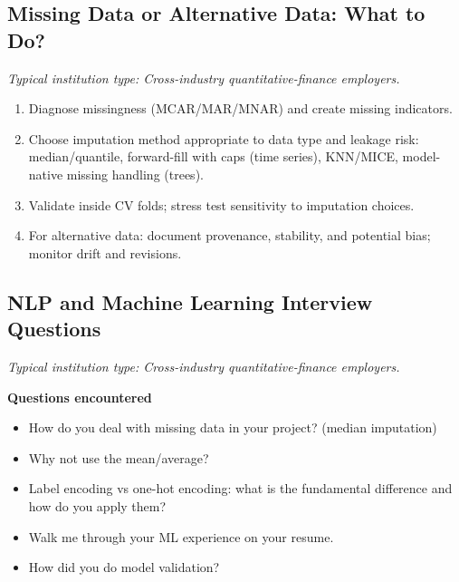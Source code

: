 \documentclass[11pt,letterpaper,openany]{book}
\newcommand{\RoleProfile}[2]{%
  \subsection{#1}%
  \noindent\textit{Typical institution type: #2.}\par
}
\begin{document}
\RoleProfile{Missing Data or Alternative Data: What to Do?}{Cross-industry quantitative-finance employers}
\begin{enumerate}
  \item Diagnose missingness (MCAR/MAR/MNAR) and create missing indicators.
  \item Choose imputation method appropriate to data type and leakage risk: median/quantile, forward-fill with caps (time series), KNN/MICE, model-native missing handling (trees).
  \item Validate inside CV folds; stress test sensitivity to imputation choices.
  \item For alternative data: document provenance, stability, and potential bias; monitor drift and revisions.
\end{enumerate}

\RoleProfile{NLP and Machine Learning Interview Questions}{Cross-industry quantitative-finance employers}
\textbf{Questions encountered}
\begin{itemize}
  \item How do you deal with missing data in your project? (median imputation)
  \item Why not use the mean/average?
  \item Label encoding vs one-hot encoding: what is the fundamental difference and how do you apply them?
  \item Walk me through your ML experience on your resume.
  \item How did you do model validation?
\end{itemize}
\end{document}
